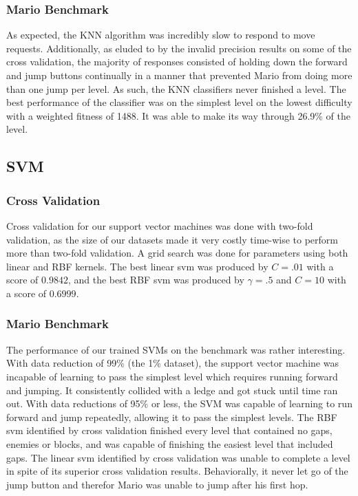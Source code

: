 \documentclass[]{article}   %
\begin{document}
\subsubsection{Mario Benchmark}
As expected, the KNN algorithm was incredibly slow to respond to move requests. Additionally, as eluded to by the invalid precision
results on some of the cross validation, the majority of responses consisted of holding down the forward and jump buttons continually
in a manner that prevented Mario from doing more than one jump per level. As such, the KNN classifiers never finished a level. The best
performance of the classifier was on the simplest level on the lowest difficulty with a weighted fitness of 1488. It was able to make its
way through 26.9\% of the level.

\subsection{SVM}
\subsubsection{Cross Validation}
Cross validation for our support vector machines was done with two-fold validation, as the size of our datasets made 
it very costly time-wise to perform more than two-fold validation. A grid search was done for parameters using both linear
and RBF kernels. The best linear svm was produced by $C = .01$ with a score of $0.9842$, and the best RBF svm was produced by
$\gamma = .5$ and $C = 10$ with a score of $0.6999$.

\subsubsection{Mario Benchmark}
The performance of our trained SVMs on the benchmark was rather interesting. With data reduction of 99\% (the 1\% dataset), the support
vector machine was incapable of learning to pass the simplest level which requires running forward and jumping. It consistently
collided with a ledge and got stuck until time ran out. With data reductions of 95\% or less, the SVM was capable of learning to
run forward and jump repeatedly, allowing it to pass the simplest levels. The RBF svm identified by cross validation finished every
level that contained no gaps, enemies or blocks, and was capable of finishing the easiest level that included gaps. The linear svm
identified by cross validation was unable to complete a level in spite of its superior cross validation results. Behaviorally, it
never let go of the jump button and therefor Mario was unable to jump after his first hop.
\end{document}
